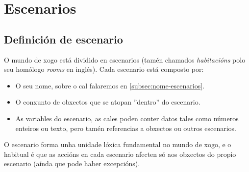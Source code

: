 \section{Escenarios}
\subsection{Definición de escenario}
O mundo de xogo está dividido en escenarios (tamén chamados {\it habitacións}
polo seu homólogo {\it rooms} en inglés). Cada escenario está composto por:
\begin{itemize}
  \item O seu nome, sobre o cal falaremos en \ref{subsec:nome-escenarios}.
  \item O conxunto de obxectos que se atopan ''dentro'' do escenario.
  \item As variables do escenario, as cales poden conter datos tales como
  números enteiros ou texto, pero tamén referencias a obxectos ou outros
  escenarios.
\end{itemize}
\par
O escenario forma unha unidade lóxica fundamental no mundo de xogo, e o habitual
é que as accións en cada escenario afecten só aos obxectos do propio escenario
(aínda que pode haber excepcións).

